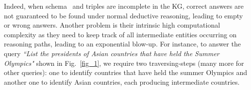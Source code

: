 
%
%
Indeed, when schema~\cite{WPKD2020} and   triples are incomplete in the KG, correct answers are not guaranteed to be found under normal deductive reasoning, leading to empty or wrong answers. Another problem is their intrinsic high computational complexity  as they need to  keep track of all intermediate entities occurring on reasoning paths, leading to an exponential blow-up. For instance, to answer the query \textit{``List the presidents of Asian countries that have held the Summer Olympics"} shown in Fig.\ \ref{fig_1}, we require two traversing-steps (many more for other queries): one to identify countries that have held the summer Olympics and another one to identify Asian countries, each producing intermediate countries.

